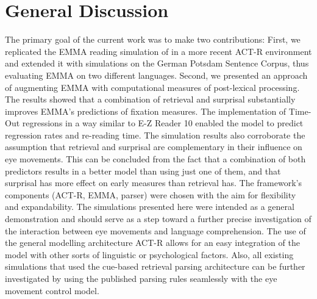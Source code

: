 \section{General Discussion}
The primary goal of the current work was to make two contributions:
First, we replicated the EMMA reading simulation of \cite{Salvucci2001} in a more recent ACT-R environment and extended it with simulations on the German Potsdam Sentence Corpus, thus evaluating EMMA on two different languages. 
Second, we presented an approach of augmenting EMMA with computational measures of post-lexical processing.  The results showed that a combination of retrieval and surprisal substantially improves EMMA's predictions of fixation measures.  The implementation of Time-Out regressions \citep{MitchellEtAl2008} in a way similar to E-Z Reader 10 enabled the model to predict regression rates and re-reading time. 
The simulation results also corroborate the assumption that retrieval and surprisal are complementary in their influence on eye movements.  This can be concluded from the fact that a combination of both predictors results in a better model than using just one of them, and that surprisal has more effect on early measures than retrieval has.
The framework's components (ACT-R, EMMA, parser) were chosen with the aim for flexibility and expandability.  The simulations presented here were intended as a general demonstration and should serve as a step toward a further precise investigation of the interaction between eye movements and language comprehension.  The use of the general modelling architecture ACT-R allows for an easy integration of the model with other sorts of linguistic or psychological factors.  Also, all existing simulations that used the cue-based retrieval parsing architecture \citep[e.g.,][]{LewisVasishth2005,VasishthLewis2006,VasishthBruessowLewis2008} can be further investigated by using the published parsing rules seamlessly with the eye movement control model.  

